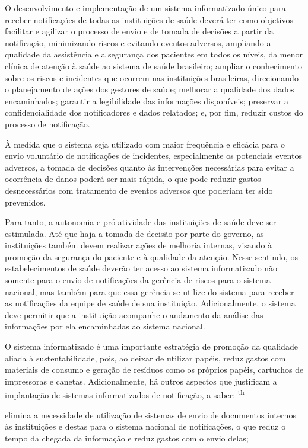 \documentclass{article}
\begin{document}
O desenvolvimento e implementação de um sistema informatizado único para receber
notificações de todas as instituições de saúde deverá ter como objetivos
facilitar e
agilizar o processo de envio e de tomada de decisões a partir da notificação,
minimizando
riscos e evitando eventos adversos, ampliando a qualidade da assistência e a
segurança dos
pacientes em todos os níveis, da menor clínica de atenção à saúde ao sistema de
saúde
brasileiro; ampliar o conhecimento sobre os riscos e incidentes que ocorrem nas
instituições
brasileiras, direcionando o planejamento de ações dos gestores de saúde;
melhorar a
qualidade dos dados encaminhados; garantir a legibilidade das informações
disponíveis;
preservar a confidencialidade dos notificadores e dados relatados; e, por fim,
reduzir
custos do processo de notificação.

À medida que o sistema seja utilizado com maior frequência e eficácia para o
envio
voluntário de notificações de incidentes, especialmente os potenciais eventos
adversos, a
tomada de decisões quanto às intervenções necessárias para evitar a ocorrência
de danos
poderá ser mais rápida, o que pode reduzir gastos desnecessários com tratamento
de eventos
adversos que poderiam ter sido prevenidos.

Para tanto, a autonomia e pró-atividade das instituições de saúde deve ser
estimulada. Até
que haja a tomada de decisão por parte do governo, as instituições também devem
realizar
ações de melhoria internas, visando à promoção da segurança do paciente e à
qualidade da
atenção. Nesse sentindo, os estabelecimentos de saúde deverão ter acesso ao
sistema
informatizado não somente para o envio de notificações da gerência de riscos
para o sistema
nacional, mas também para que essa gerência se utilize do sistema para receber
as
notificações da equipe de saúde de sua instituição. Adicionalmente, o sistema
deve permitir
que a instituição acompanhe o andamento da análise das informações por ela
encaminhadas ao
sistema nacional.

O sistema informatizado é uma importante estratégia de promoção da qualidade
aliada à
sustentabilidade, pois, ao deixar de utilizar papéis, reduz gastos com materiais
de consumo
e geração de resíduos como os próprios papéis, cartuchos de impressoras e
canetas.
Adicionalmente, há outros aspectos que justificam a implantação de sistemas
informatizados
de notificação, a saber: \textsuperscript{th}

elimina a necessidade de utilização de sistemas de envio de documentos internos
às
instituições e destas para o sistema nacional de notificações, o que reduz o
tempo da
chegada da informação e reduz gastos com o envio delas;
\end{document}
